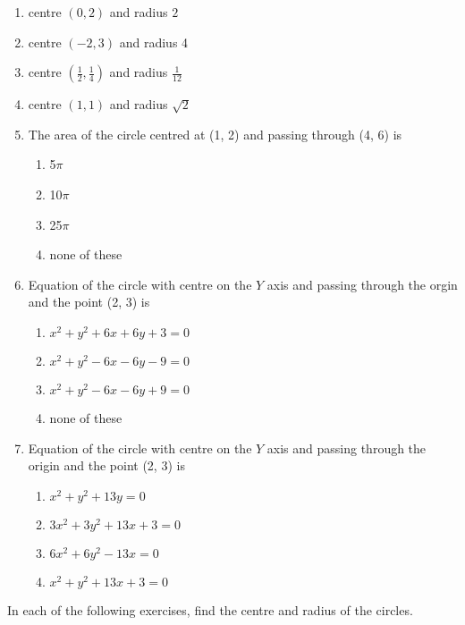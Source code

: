 \begin{enumerate}[label=\thesubsection.\arabic*, ref=\thesubsection.\theenumi, resume*]
 \item centre $(0, 2)$ and radius $2$
	 \\
		\solution
\label{chapters/11/11/1/1}

%
  \item centre $(-2, 3)$ and radius 4
	 \\
		\solution
\label{chapters/11/11/1/2}


  \item centre $\left(\frac{1}{2},  \frac{1}{4}\right)$ and radius $\frac{1}{12}$
\label{chapters/11/11/1/3}
	 \\
		\solution

  \item centre $(1, 1)$ and radius $\sqrt{2}$
	 \\
		\solution

\item The area of the circle centred at (1, 2) and passing through (4, 6) is
\begin{enumerate}
\item 5$\pi$ 
\item 10$\pi$
 \item 25$\pi$ 
\item none of these
\end{enumerate}
\item Equation of the circle with centre on the $Y$ axis and passing through the orgin and the point (2, 3) is
\begin{enumerate}
\item $x^2+y^2+6x+6y+3=0$ 
\item $x^2+y^2-6x-6y-9=0$
\item $x^2+y^2-6x-6y+9=0$
\item none of these
\end{enumerate}
\item Equation of the circle with centre on the  $Y$ axis and passing through the origin and the point (2, 3) is  
\begin{enumerate}
\item $x^2+y^2+13y=0$
\item $3x^2+3y^2+13x+3=0$
\item $6x^2+6y^2-13x=0$
\item $x^2+y^2+13x+3=0$
\end{enumerate}
\end{enumerate}
In each of the following exercises,   find the centre and radius of the circles.
